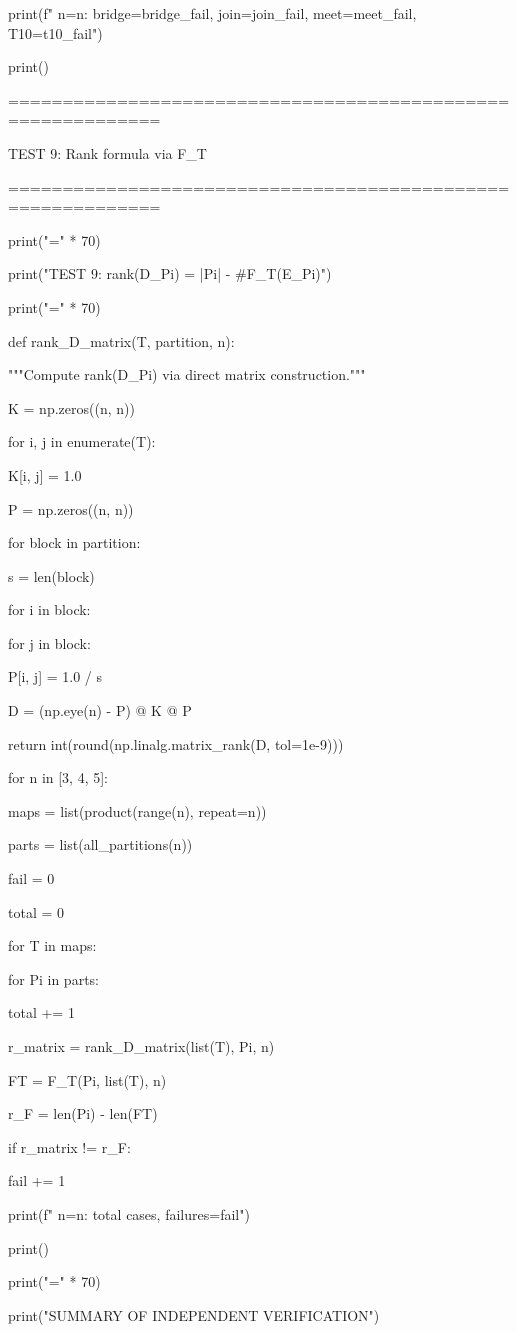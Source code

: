 print(f"  n={n}: bridge={bridge_fail}, join={join_fail}, meet={meet_fail}, T10={t10_fail}")  



print()


============================================================


TEST 9: Rank formula via F_T


============================================================


print("=" * 70)

print("TEST 9: rank(D_Pi) = |Pi| - #F_T(E_Pi)")

print("=" * 70)


def rank_D_matrix(T, partition, n):

"""Compute rank(D_Pi) via direct matrix construction."""

K = np.zeros((n, n))

for i, j in enumerate(T):

K[i, j] = 1.0

P = np.zeros((n, n))

for block in partition:

s = len(block)

for i in block:

for j in block:

P[i, j] = 1.0 / s

D = (np.eye(n) - P) @ K @ P

return int(round(np.linalg.matrix_rank(D, tol=1e-9)))


for n in [3, 4, 5]:

maps = list(product(range(n), repeat=n))

parts = list(all_partitions(n))

fail = 0

total = 0

for T in maps:

for Pi in parts:

total += 1

r_matrix = rank_D_matrix(list(T), Pi, n)

FT = F_T(Pi, list(T), n)

r_F = len(Pi) - len(FT)

if r_matrix != r_F:

fail += 1

print(f"  n={n}: {total} cases, failures={fail}")


print()


print("=" * 70)

print("SUMMARY OF INDEPENDENT VERIFICATION")

